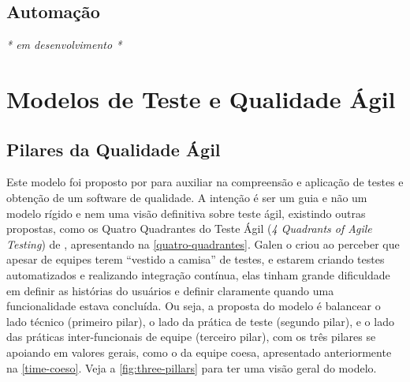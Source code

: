 \documentclass[
	12pt,				%
	openright,			%
	oneside,			%
	a4paper,			%
	english,			%
	brazil,				%
	]{abntex2}
\begin{document}
\subsection{Automação}
\emph{* em desenvolvimento *}

\section{Modelos de Teste e Qualidade Ágil}

\subsection{Pilares da Qualidade Ágil}
Este modelo foi proposto por  para auxiliar na compreensão e aplicação de testes e obtenção de um software de qualidade. A intenção é ser um guia e não um modelo rígido e nem uma visão definitiva sobre teste ágil, existindo outras propostas, como os Quatro Quadrantes do Teste Ágil (\emph{4 Quadrants of Agile Testing}) de , apresentando na \autoref{quatro-quadrantes}. Galen o criou ao perceber que apesar de equipes terem ``vestido a camisa'' de testes, e estarem criando testes automatizados e realizando integração contínua, elas tinham grande dificuldade em definir as histórias do usuários e definir claramente quando uma funcionalidade estava concluída. Ou seja, a proposta do modelo é balancear o lado técnico (primeiro pilar), o lado da prática de teste (segundo pilar), e o lado das práticas inter-funcionais de equipe (terceiro pilar), com os três pilares se apoiando em valores gerais, como o da equipe coesa, apresentado anteriormente na \autoref{time-coeso}. Veja a \autoref{fig:three-pillars} para ter uma visão geral do modelo.
\end{document}
